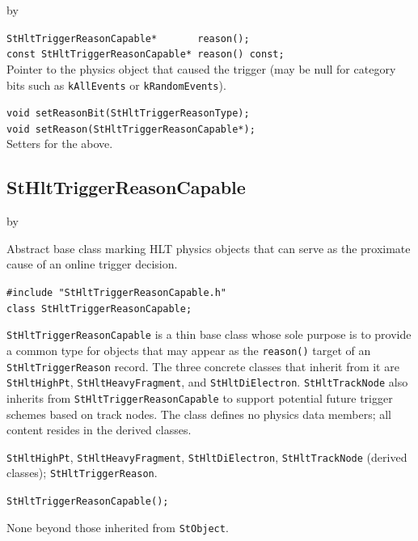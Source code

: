 \documentclass[twoside]{article}
\newcommand{\entrylabel}[1]{\mbox{\textbf{{#1}}}\hfil}%
\newenvironment{entry}
{\begin{list}{}%
    {\renewcommand{\makelabel}{\entrylabel}%
     \setlength{\labelwidth}{90pt}%
     \setlength{\leftmargin}{\labelwidth}
     \advance\leftmargin by \labelsep%
      }%
    }%
  {\end{list}}
\newcommand{\Entrylabel}[1]%
{\raisebox{0pt}[1ex][0pt]{\makebox[\labelwidth][l]%
    {\parbox[t]{\labelwidth}{\hspace{0pt}\textbf{{#1}}}}}}
\newenvironment{Entry}%
{\renewcommand{\entrylabel}{\Entrylabel}\begin{entry}}%
  {\end{entry}}
\begin{document}
\begin{Entry}
    \verb+StHltTriggerReasonCapable*       reason();+\\
    \verb+const StHltTriggerReasonCapable* reason() const;+\\
    Pointer to the physics object that caused the trigger (may be null
    for category bits such as \texttt{kAllEvents} or
    \texttt{kRandomEvents}).

    \verb+void setReasonBit(StHltTriggerReasonType);+\\
    \verb+void setReason(StHltTriggerReasonCapable*);+\\
    Setters for the above.
\end{Entry}
\clearpage

\subsection{StHltTriggerReasonCapable}
\label{sec:StHltTriggerReasonCapable}
\begin{Entry}
\item[Summary] Abstract base class marking HLT physics objects that can
    serve as the proximate cause of an online trigger decision.
\item[Synopsis]
    \verb+#include "StHltTriggerReasonCapable.h"+\\
    \verb+class StHltTriggerReasonCapable;+\\
\item[Description]
    \texttt{StHltTriggerReasonCapable} is a thin base class whose sole
    purpose is to provide a common type for objects that may appear as
    the \texttt{reason()} target of an \texttt{StHltTriggerReason}
    record.  The three concrete classes that inherit from it are
    \texttt{StHltHighPt}, \texttt{StHltHeavyFragment}, and
    \texttt{StHltDiElectron}.  \texttt{StHltTrackNode} also inherits
    from \texttt{StHltTriggerReasonCapable} to support potential future
    trigger schemes based on track nodes.  The class defines no physics
    data members; all content resides in the derived classes.
\item[Related Classes]
    \texttt{StHltHighPt}, \texttt{StHltHeavyFragment},
    \texttt{StHltDiElectron}, \texttt{StHltTrackNode} (derived classes);
    \texttt{StHltTriggerReason}.
\item[Public\\ Constructors]
    \verb+StHltTriggerReasonCapable();+\\
\item[Public Member\\ Functions]
    None beyond those inherited from \texttt{StObject}.
\end{Entry}
\clearpage
\end{document}
